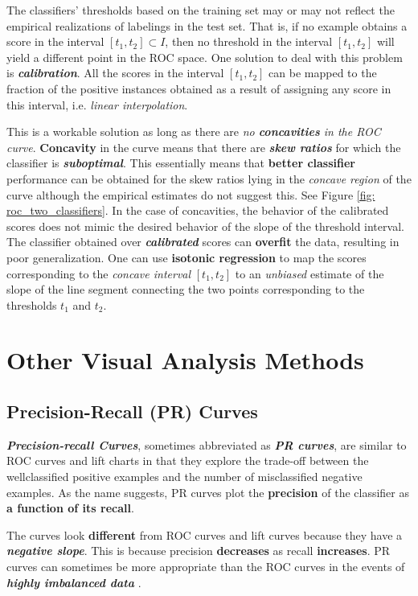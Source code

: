 \documentclass[11pt]{article}
\begin{document}
The classifiers' thresholds based on the training set may or may not reflect the empirical realizations of labelings in the test set. That is, if no example obtains a score in the interval $[t_1, t_2] \subset I$, then no threshold in the interval $[t_1, t_2]$ will yield a different point in the ROC space. One solution to deal with this problem is
\emph{\textbf{calibration}}. All the scores in the interval $[t_1, t_2]$ can be mapped to the fraction of the positive instances obtained as a result of assigning any score in this interval, i.e. \emph{linear interpolation}.

This is a workable solution as long as there are \emph{no \textbf{concavities} in the ROC curve}.  \textbf{Concavity} in the curve means that there are \emph{\textbf{skew ratios}} for which the classifier is \emph{\textbf{suboptimal}}. This essentially means that \textbf{better classifier}  performance can be obtained for the skew ratios lying in the \emph{concave region} of the curve although the empirical estimates do not suggest this. See Figure \ref{fig: roc_two_classifiers}. In the case of concavities, the behavior of the calibrated scores does not mimic the desired behavior of the slope of the threshold interval. The classifier obtained over \emph{\textbf{calibrated}} scores can \textbf{overfit} the data, resulting in poor generalization. One can use \textbf{isotonic regression} to map the scores corresponding to the \emph{concave interval} $[t_1, t_2]$  to an \emph{unbiased} estimate of the slope of the line segment connecting the two points corresponding to the thresholds $t_1$ and $t_2$.
\section{Other Visual Analysis Methods}
\subsection{Precision-Recall (PR) Curves}
\emph{\textbf{Precision-recall Curves}}, sometimes abbreviated as \emph{\textbf{PR curves}}, are similar to ROC curves and lift charts in that they explore the trade-off between the wellclassified positive examples and the number of misclassified negative examples. As the name suggests, PR curves plot the \textbf{precision} of the classifier as \textbf{a function of its recall}.  

The curves look \textbf{different} from ROC curves and lift curves because they have a \textbf{\emph{negative slope}}. This is because precision \textbf{decreases} as recall \textbf{increases}. PR  curves can sometimes be more appropriate than the ROC curves in the events of \emph{\textbf{highly imbalanced data}} \citep{davis2006relationship}.
\end{document}
